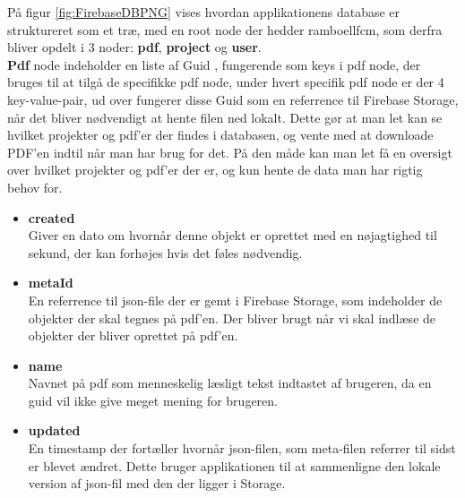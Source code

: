 På figur \ref{fig:FirebaseDBPNG} vises hvordan applikationens database er struktureret som et træ, med en root node\cite{rootNode} der hedder ramboellfcm, som derfra bliver opdelt i 3 noder:
\textbf{pdf}, \textbf{project} og \textbf{user}.\\

\textbf{Pdf} node indeholder en liste af Guid \cite{GUID}, fungerende som keys i pdf node, der bruges til at tilgå de specifikke pdf node, under hvert specifik pdf node er der 4 key-value-pair\cite{KVP}, ud over fungerer disse Guid som en referrence til Firebase Storage, når det bliver nødvendigt at hente filen ned lokalt.  Dette gør at man let kan se hvilket projekter og pdf'er der findes i databasen, og vente med at downloade PDF'en indtil når man har brug for det. På den måde kan man let få en oversigt over hvilket projekter og pdf'er der er, og kun hente de data man har rigtig behov for. 
\begin{itemize}
	\item \textbf{created}\\
	Giver en dato om hvornår denne objekt er oprettet med en nøjagtighed til sekund, der kan forhøjes hvis det føles nødvendig.\\
	\item \textbf{metaId}\\
	En referrence til json-file der er gemt i Firebase Storage\cite{FirebaseStorage}, som indeholder de objekter der skal tegnes på pdf'en. Der bliver brugt når vi skal indlæse de objekter der bliver oprettet på pdf'en.\\ 
	
	\item \textbf{name}\\
	Navnet på pdf som menneskelig læsligt tekst indtastet af brugeren, da en guid vil ikke give meget mening for brugeren.\\
	
	\item \textbf{updated}\\
	En timestamp der fortæller hvornår json-filen, som meta-filen referrer til sidst er blevet ændret. Dette bruger applikationen til at sammenligne den lokale version af json-fil med den der ligger i Storage.   
\end{itemize}

